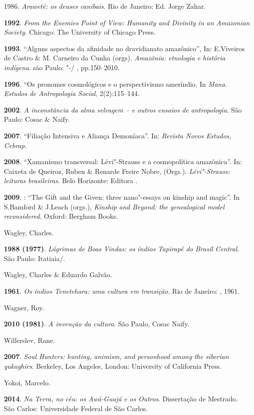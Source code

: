 1986. \emph{Araweté: os deuses canibais}. Rio de Janeiro: Ed. Jorge
Zahar.

\textbf{1992}. \emph{From the Enemies Point of View: Humanity and
Divinity in an Amazonian Society}. Chicago: The University of Chicago
Press.

\textbf{1993}. ``Alguns aspectos da afinidade no dravidianato amazônico'',
In: E.Viveiros de Castro \& M. Carneiro da Cunha (orgs). \emph{Amazônia:
etnologia e história indígena}. são Paulo: "-/ ,
pp.150--2010.

\textbf{1996}. ``Os pronomes cosmológicos e o perspectivismo ameríndio.
In \emph{Mana}. \emph{Estudos de Antropologia Social}, 2(2):115--144.

\textbf{2002}. \emph{A inconstância da alma selvagem -- e outros ensaios
de antropologia}. São Paulo: Cosac \& Naify.

\textbf{2007}. ``Filiação Intensiva e Aliança Demoníaca''. In:
\emph{Revista Novos Estudos, Cebrap}.

\textbf{2008}. ``Xamanismo transversal: Lévi"-Strauss e a cosmopolítica
amazônica''. In: Caixeta de Queiroz, Ruben \& Renarde Freire Nobre,
(Orgs.). \emph{Lévi"-Strauss: leituras brasileiras}. Belo Horizonte:
Editora .

\textbf{2009}. : ``The Gift and the Given: three nano"-essays on kinship
and magic''. In S.Bamford \& J.Leach (orgs.), \emph{Kinship and Beyond:
the genealogical model reconsidered}. Oxford: Bergham Books.

Wagley, Charles.

\textbf{1988 (1977)}. \emph{Lágrimas de Boas Vindas: os índios Tapirapé
do Brasil Central}. São Paulo: Itatiaia/.

Wagley, Charles \& Eduardo Galvão.

\textbf{1961}. \emph{Os índios Tenetehara: uma cultura em transição}.
Rio de Janeiro: , 1961.

Wagner, Roy.

\textbf{2010 (1981)}. \emph{A invenção da cultura}. São Paulo, Cosac
Naify.

Willerslev, Rane.

\textbf{2007}. \emph{Soul Hunters: hunting, animism, and personhood
among the siberian yukaghirs}. Berkeley, Los Angeles, London: University
of California Press.

Yokoi, Marcelo.

\textbf{2014}. \emph{Na Terra, no céu: os Awá-Guajá e os Outros}.
Dissertação de Mestrado. São Carlos: Universidade Federal de São Carlos.

